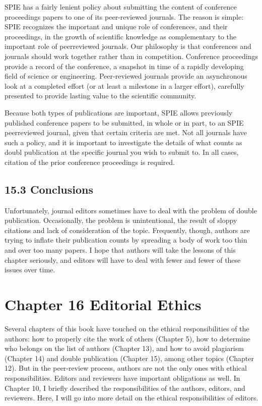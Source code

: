 SPIE has a fairly lenient policy about submitting the content of conference proceedings papers to one of its peer-reviewed journals. The reason is simple: SPIE recognizes the important and unique role of conferences, and their proceedings, in the growth of scientific knowledge as complementary to the important role of peerreviewed journals. Our philosophy is that conferences and journals should work together rather than in competition. Conference proceedings provide a record of the conference, a snapshot in time of a rapidly developing field of science or engineering. Peer-reviewed journals provide an asynchronous look at a completed effort (or at least a milestone in a larger effort), carefully presented to provide lasting value to the scientific community.

Because both types of publications are important, SPIE allows previously published conference papers to be submitted, in whole or in part, to an SPIE peerreviewed journal, given that certain criteria are met. Not all journals have such a policy, and it is important to investigate the details of what counts as doubl publication at the specific journal you wish to submit to. In all cases, citation of the prior conference proceedings is required.

\subsection*{15.3 Conclusions}
Unfortunately, journal editors sometimes have to deal with the problem of double publication. Occasionally, the problem is unintentional, the result of sloppy citations and lack of consideration of the topic. Frequently, though, authors are trying to inflate their publication counts by spreading a body of work too thin and over too many papers. I hope that authors will take the lessons of this chapter seriously, and editors will have to deal with fewer and fewer of these issues over time.

\section*{Chapter 16 Editorial Ethics}
Several chapters of this book have touched on the ethical responsibilities of the authors: how to properly cite the work of others (Chapter 5), how to determine who belongs on the list of authors (Chapter 13), and how to avoid plagiarism (Chapter 14) and double publication (Chapter 15), among other topics (Chapter 12). But in the peer-review process, authors are not the only ones with ethical responsibilities. Editors and reviewers have important obligations as well. In Chapter 10, I briefly described the responsibilities of the authors, editors, and reviewers. Here, I will go into more detail on the ethical responsibilities of editors.

